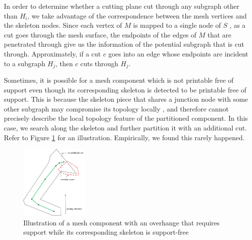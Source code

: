 In order to determine whether a cutting plane cut through any subgraph other than $H_i$, we take advantage of the correspondence between the mesh vertices and the skeleton nodes. Since each vertex of $M$ is mapped to a single node of $S$ \cite{AuTCCL08}, as a cut goes through the mesh surface, the endpoints of the edges of $M$ that are penetrated through give us the information of the potential subgraph that is cut through. Approximately, if a cut $c$ goes into an edge whose endpoints are incident to a subgraph $H_j$, then $c$ cuts through $H_j$.









Sometimes, it is possible for a mesh component which is not printable free of support even though its corresponding skeleton is detected to be printable free of support. This is because the skeleton piece that shares a junction node with some other subgraph may compromise its topology locally \cite{AuTCCL08}, and therefore cannot precisely describe the local topology feature of the partitioned component. In this case, we search along the skeleton and further partition it with an additional cut. Refer to Figure \ref{fig:arm} for an illustration. Empirically, we found this rarely happened.

\begin{figure}[tbp]
  \centering
  \includegraphics[width=0.3\textwidth]{figs/arm.png}
  \caption{\label{fig:arm}%
           Illustration of a mesh component with an overhange that requires support while its corresponding skeleton is support-free}
\end{figure}









